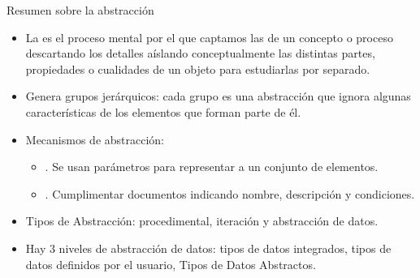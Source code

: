 \documentclass[10pt,envcountsect,spanish]{beamer}
\begin{document}
\begin{frame}{Resumen sobre la abstracción}


\begin{itemize}
\item La   es el proceso mental por el que captamos las  de un concepto o proceso descartando los detalles aíslando conceptualmente las distintas partes, propiedades o cualidades de un objeto para estudiarlas por separado. 

\item Genera grupos jerárquicos: cada grupo es una abstracción que ignora algunas características de los elementos que forman parte de él. 


\item Mecanismos de abstracción:
\begin{itemize} 

\item {}. Se usan parámetros para representar a un conjunto de elementos.

\item {}. Cumplimentar documentos indicando nombre, descripción y condiciones.

\end{itemize}


\item {Tipos de Abstracción}: procedimental, iteración y abstracción de datos.

\item Hay 3 niveles de abstracción de datos: tipos de datos integrados, tipos de datos definidos por el usuario, Tipos de Datos Abstractos.
\end{itemize}


\end{frame}
\end{document}
